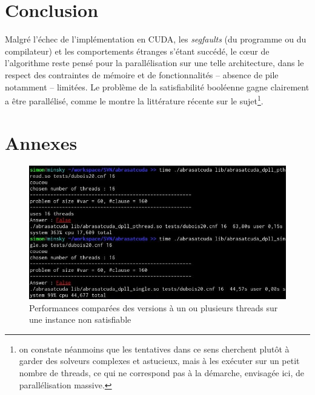 \documentclass{article}
\newcommand{\cuda}{\textsc{CUDA}}
\begin{document}
\section{Conclusion}
Malgré l'échec de l'implémentation en \cuda, les \emph{segfaults} (du programme ou du compilateur) et les comportements étranges s'étant succédé, le cœur de l'algorithme reste pensé pour la parallélisation sur une telle architecture, dans le respect des contraintes de mémoire et de fonctionnalités -- absence de pile notamment -- limitées. Le problème de la satisfiabilité booléenne gagne clairement a être parallélisé, comme le montre la littérature récente sur le sujet\footnote{on constate néanmoins que les tentatives dans ce sens cherchent plutôt à garder des solveurs complexes et astucieux, mais à les exécuter sur un petit nombre de threads, ce qui ne correspond pas à la démarche, envisagée ici, de parallélisation massive.}.

\section{Annexes}

\begin{figure}[hp]
\includegraphics[width = 1.0\textwidth]{./benchmark.jpg}
  \caption[mono-threadé]{Performances comparées des versions à un ou plusieurs threads sur une instance non satisfiable}
  \label{benchmark}
\end{figure}
\end{document}
